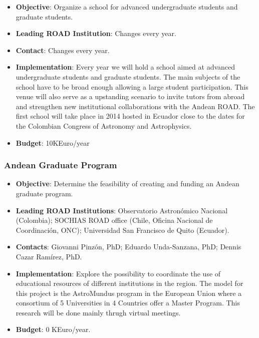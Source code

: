 \documentclass[12pt]{article}
\begin{document}
\begin{itemize}

\item{\bf Objective}: Organize a school for advanced undergraduate
  students and graduate students.
\item{\bf Leading ROAD Institution}: Changes every year.
\item{\bf Contact}: Changes every year.
\item{\bf Implementation}:
Every year we will hold a school aimed at
  advanced undergraduate students and graduate students. The main
  subjects of the school have to be broad enough allowing a large
  student participation. This venue will also serve as a upstanding
  scenario to invite tutors from abroad and strengthen new
  institutional collaborations with the Andean ROAD. The first school
  will take place in 2014 hosted in Ecuador close to the dates for the
  Colombian Congress of Astronomy and Astrophysics.  
\item{\bf Budget}: 10KEuro/year
\end{itemize}


\subsubsection{Andean Graduate Program}
\begin{itemize}
\item{\bf Objective}: Determine the feasibility of creating and
  funding an Andean graduate program. 
\item{\bf Leading ROAD Institutions}: Observatorio Astron\'omico
  Nacional (Colombia); SOCHIAS ROAD office  (Chile, Oficina
  Nacional de Coordinaci\'on, ONC);  Universidad San
  Francisco de Quito (Ecuador).
\item{\bf Contacts}: Giovanni Pinz\'on, PhD; Eduardo Unda-Sanzana,
  PhD; Dennis Cazar Ram\'irez, PhD. 
\item{\bf Implementation}:
  Explore the possibility to coordinate the use of
  educational resources of different institutions in the region. The
  model for this project is the AstroMundus program in the European
  Union where a consortium of 5 Universities in 4 Countries offer a
  Master Program.  This research will be done mainly thrugh virtual
  meetings.  
\item{\bf Budget}: 0 KEuro/year.
\end{itemize}
\end{document}
